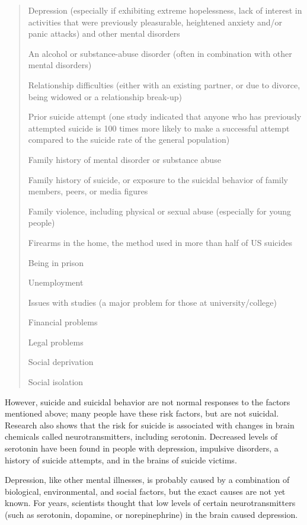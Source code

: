 \documentclass[12pt]{article}
\begin{document}
\begin{verse}
Depression (especially if exhibiting extreme hopelessness, lack of interest in activities that were previously pleasurable, heightened anxiety and/or panic attacks) and other mental disorders

An alcohol or substance-abuse disorder (often in combination with other mental disorders)

Relationship difficulties (either with an existing partner, or due to divorce, being widowed or a relationship break-up)

Prior suicide attempt (one study indicated that anyone who has previously attempted suicide is 100 times more likely to make a successful attempt compared to the suicide rate of the general population)

Family history of mental disorder or substance abuse

Family history of suicide, or exposure to the suicidal behavior of family members, peers, or media figures

Family violence, including physical or sexual abuse (especially for young people)

Firearms in the home, the method used in more than half of US suicides

Being in prison

Unemployment

Issues with studies (a major problem for those at university/college)

Financial problems

Legal problems

Social deprivation

Social isolation
\end{verse}

However, suicide and suicidal behavior are not normal responses to the factors mentioned above; many people have these risk factors, but are not suicidal. Research also shows that the risk for suicide is associated with changes in brain chemicals called neurotransmitters, including serotonin. Decreased levels of serotonin have been found in people with depression, impulsive disorders, a history of suicide attempts, and in the brains of suicide victims.

Depression, like other mental illnesses, is probably caused by a combination of biological, environmental, and social factors, but the exact causes are not yet known. For years, scientists thought that low levels of certain neurotransmitters (such as serotonin, dopamine, or norepinephrine) in the brain caused depression.
\end{document}
